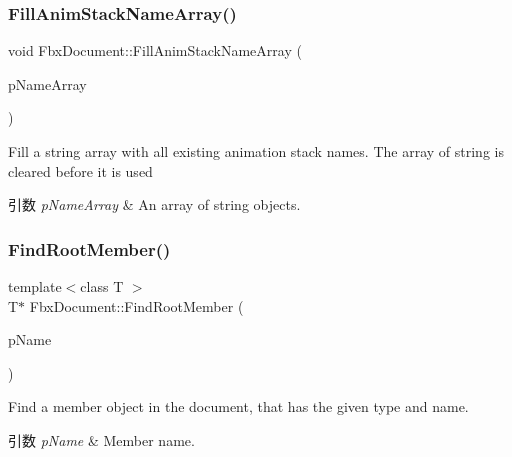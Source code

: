 \mbox{\label{class_fbx_document_a7a60224db8d86ec61e66263bbb683d4e}} 
\subsubsection{\texorpdfstring{Fill\+Anim\+Stack\+Name\+Array()}{FillAnimStackNameArray()}}
{\footnotesize\ttfamily void Fbx\+Document\+::\+Fill\+Anim\+Stack\+Name\+Array (\begin{DoxyParamCaption}\item[{\hyperlink{class_fbx_array}{Fbx\+Array}$<$ \hyperlink{class_fbx_string}{Fbx\+String} $\ast$$>$ \&}]{p\+Name\+Array }\end{DoxyParamCaption})}

Fill a string array with all existing animation stack names. The array of string is cleared before it is used 
\begin{DoxyParams}{引数}
{\em p\+Name\+Array} & An array of string objects. \\
\hline
\end{DoxyParams}
\mbox{\label{class_fbx_document_a0bbbf150471a9166a598a01fbd535894}} 
\subsubsection{\texorpdfstring{Find\+Root\+Member()}{FindRootMember()}}
{\footnotesize\ttfamily template$<$class T $>$ \\
T$\ast$ Fbx\+Document\+::\+Find\+Root\+Member (\begin{DoxyParamCaption}\item[{char $\ast$}]{p\+Name }\end{DoxyParamCaption})\hspace{0.3cm}{\ttfamily [inline]}}

Find a member object in the document, that has the given type and name. 
\begin{DoxyParams}{引数}
{\em p\+Name} & Member name. \\
\hline
\end{DoxyParams}



